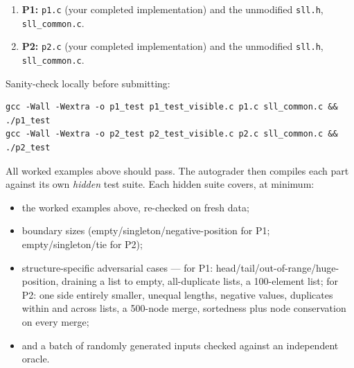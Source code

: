 \documentclass[11pt]{article}
\begin{document}
\begin{enumerate}
  \item \textbf{P1:} \texttt{p1.c} (your completed implementation) and the unmodified \texttt{sll.h}, \texttt{sll\_common.c}.
  \item \textbf{P2:} \texttt{p2.c} (your completed implementation) and the unmodified \texttt{sll.h}, \texttt{sll\_common.c}.
\end{enumerate}

Sanity-check locally before submitting:
\begin{verbatim}
gcc -Wall -Wextra -o p1_test p1_test_visible.c p1.c sll_common.c && ./p1_test
gcc -Wall -Wextra -o p2_test p2_test_visible.c p2.c sll_common.c && ./p2_test
\end{verbatim}
All worked examples above should pass. The autograder then compiles each part against its own \emph{hidden} test suite. Each hidden suite covers, at minimum:
\begin{itemize}
  \item the worked examples above, re-checked on fresh data;
  \item boundary sizes (empty/singleton/negative-position for P1; empty/singleton/tie for P2);
  \item structure-specific adversarial cases --- for P1: head/tail/out-of-range/huge-position, draining a list to empty, all-duplicate lists, a 100-element list; for P2: one side entirely smaller, unequal lengths, negative values, duplicates within and across lists, a 500-node merge, sortedness plus node conservation on every merge;
  \item and a batch of randomly generated inputs checked against an independent oracle.
\end{itemize}
\end{document}
